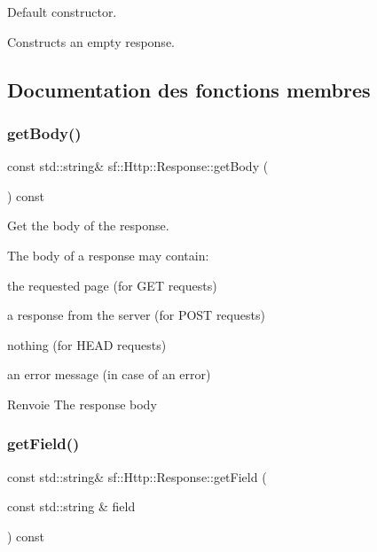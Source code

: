 Default constructor. 

Constructs an empty response. 

\subsection{Documentation des fonctions membres}
\mbox{\label{classsf_1_1Http_1_1Response_ab3bfc29867563aa815f6460eeea16136}} 
\subsubsection{\texorpdfstring{get\+Body()}{getBody()}}
{\footnotesize\ttfamily const std\+::string\& sf\+::\+Http\+::\+Response\+::get\+Body (\begin{DoxyParamCaption}{ }\end{DoxyParamCaption}) const}



Get the body of the response. 

The body of a response may contain\+: \begin{DoxyItemize}
\item the requested page (for G\+ET requests) \item a response from the server (for P\+O\+ST requests) \item nothing (for H\+E\+AD requests) \item an error message (in case of an error)\end{DoxyItemize}
\begin{DoxyReturn}{Renvoie}
The response body 
\end{DoxyReturn}
\mbox{\label{classsf_1_1Http_1_1Response_a6dedeaeea13b5ebf0c41fc7a1c1885e5}} 
\subsubsection{\texorpdfstring{get\+Field()}{getField()}}
{\footnotesize\ttfamily const std\+::string\& sf\+::\+Http\+::\+Response\+::get\+Field (\begin{DoxyParamCaption}\item[{const std\+::string \&}]{field }\end{DoxyParamCaption}) const}



